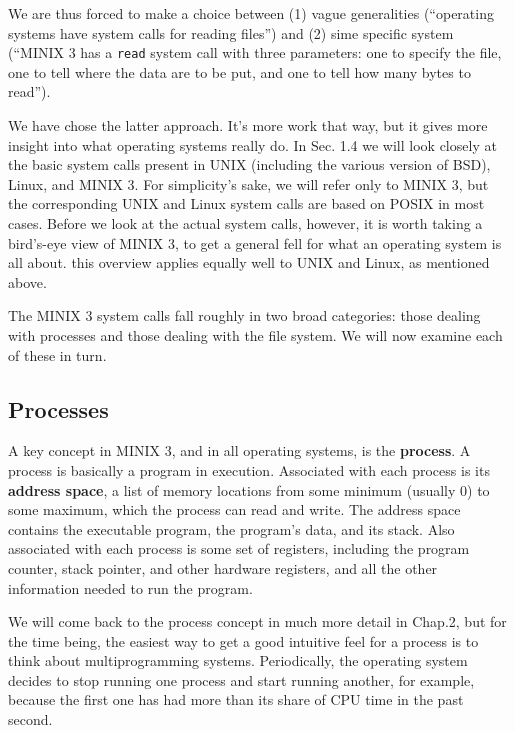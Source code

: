 \documentclass{book}
\newcommand {\kw}  [1] {\textbf{#1}}
\newcommand {\cmd} [1] {\texttt{#1}}
\begin{document}
We are thus forced to make a choice between (1) vague generalities (``operating systems have system calls for reading files'')
and (2) sime specific system (``MINIX 3 has a \cmd{read} system call with three parameters: 
one to specify the file, one to tell where the data are to be put, and one to tell how many bytes to read'').

We have chose the latter approach.
It's more work that way, but it gives more insight into what operating systems really do.
In Sec. 1.4 we will look closely at the basic system calls present in UNIX (including the various version of BSD), Linux, and MINIX 3.
For simplicity's sake, we will refer only to MINIX 3, but the corresponding UNIX and Linux system calls are based on POSIX in most cases.
Before we look at the actual system calls, however, it is worth taking a bird's-eye view of MINIX 3, 
to get a general fell for what an operating system is all about.
this overview applies equally well to UNIX and Linux, as mentioned above.

The MINIX 3 system calls fall roughly in two broad categories: those dealing with processes and those dealing with the file system.
We will now examine each of these in turn.

\subsection{Processes}
A key concept in MINIX 3, and in all operating systems, is the \kw{process}.
A process is basically a program in execution.
Associated with each process is its \kw{address space}, a list of memory locations from some minimum (usually 0) to some maximum,
which the process can read and write.
The address space contains the executable program, the program's data, and its stack.
Also associated with each process is some set of registers, including the program counter, stack pointer, and other hardware registers, 
and all the other information needed to run the program.
 
We will come back to the process concept in much more detail in Chap.2, but for the time being, 
the easiest way to get a good intuitive feel for a process is to think about multiprogramming systems.
Periodically, the operating system decides to stop running one process and start running another, for example, 
because the first one has had more than its share of CPU time in the past second.
\end{document}
